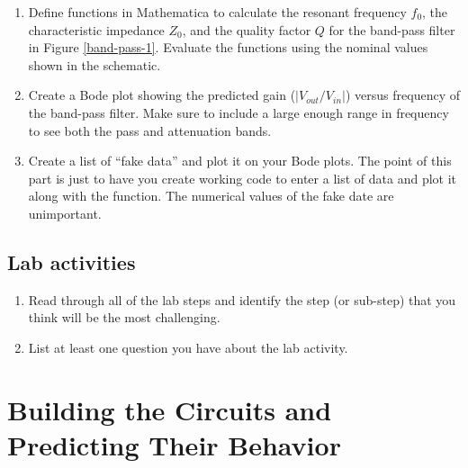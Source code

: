 \documentclass[10pt]{PhysLab1C} %
\begin{document}
\begin{enumerate}
\def\labelenumi{\arabic{enumi}.}
\item
  Define functions in Mathematica to calculate the resonant frequency
  $f_0$, the characteristic
  impedance $Z_0$, and the quality factor $Q$ for the band-pass filter in
  Figure \ref{band-pass-1}. Evaluate the
  functions using the nominal values shown in the schematic.
\item
  Create a Bode plot showing the predicted gain (\(|V_{out}/V_{in}|\))
  versus frequency of the band-pass filter. Make sure to include a large
  enough range in frequency to see both the pass
  and attenuation bands.
\item
  Create a list of ``fake data'' and plot it on your Bode plots. The
  point of this part is just to
  have you create working code to enter a list of data and plot it along
  with the function.
  The numerical values of the fake date are unimportant.
\end{enumerate}

\subsection{Lab activities}


\begin{enumerate}
\def\labelenumi{\arabic{enumi}.}
\item
  Read through all of the lab steps and identify the step (or sub-step)
  that you think will be the most challenging.
\item
  List at least one question you have about the lab activity.
\end{enumerate}



\section{Building the Circuits and Predicting Their Behavior}

\end{document}
